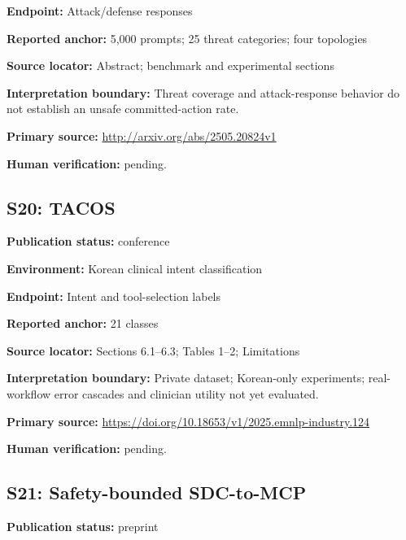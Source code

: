 \documentclass[journal,onecolumn,10pt]{IEEEtran}
\begin{document}
\noindent\textbf{Endpoint:} Attack/defense responses\par

\noindent\textbf{Reported anchor:} 5,000 prompts; 25 threat categories; four topologies\par

\noindent\textbf{Source locator:} Abstract; benchmark and experimental sections\par

\noindent\textbf{Interpretation boundary:} Threat coverage and attack-response behavior do not establish an unsafe committed-action rate.\par

\noindent\textbf{Primary source:} \url{http://arxiv.org/abs/2505.20824v1}\par
\noindent\textbf{Human verification:} pending.

\subsection*{S20: TACOS}

\noindent\textbf{Publication status:} conference\par

\noindent\textbf{Environment:} Korean clinical intent classification\par

\noindent\textbf{Endpoint:} Intent and tool-selection labels\par

\noindent\textbf{Reported anchor:} 21 classes\par

\noindent\textbf{Source locator:} Sections 6.1–6.3; Tables 1–2; Limitations\par

\noindent\textbf{Interpretation boundary:} Private dataset; Korean-only experiments; real-workflow error cascades and clinician utility not yet evaluated.\par

\noindent\textbf{Primary source:} \url{https://doi.org/10.18653/v1/2025.emnlp-industry.124}\par
\noindent\textbf{Human verification:} pending.

\subsection*{S21: Safety-bounded SDC-to-MCP}

\noindent\textbf{Publication status:} preprint\par
\end{document}
